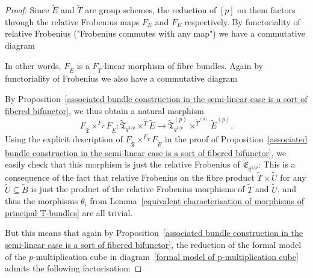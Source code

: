 \documentclass[11pt,oneside]{amsart}
\theoremstyle{definition}
\theoremstyle{remark}
\begin{document}
\begin{proof}
	Since $\tilde{E}$ and $\tilde{T}$ are group schemes, the reduction of $[p]$ on them factors through the relative Frobenius maps $F_E$ and $F_E$ respectively. By functoriality of relative Frobenius ("Frobenius commutes with any map") we have a commutative diagram
	\begin{center}
	\end{center}
	In other words, $F_{\tilde E}$ is a $F_{\tilde T}$-linear morphism of fibre bundles. Again by functoriality of Frobenius we also have a commutative diagram
	\begin{center}
	\end{center}
	
	By Proposition~\ref{associated bundle construction in the semi-linear case is a sort of fibered bifunctor}, we thus obtain a natural morphism
	\[F_{\tilde{\mathfrak{T}}}\times^{F_{\tilde{T}}} F_{\tilde
		E}:\tilde{\mathfrak T}_{q^{1/p}}\times^{\tilde T}\tilde E \rightarrow \tilde{\mathfrak T}_{q^{1/p}}^{(p)}\times^{\tilde T^{(p)}}\tilde E^{(p)}. \]
	Using the explicit description of $F_{\tilde{\mathfrak{T}}}\times^{F_{\tilde{T}}} F_{\tilde
		E}$ in the proof of Proposition~\ref{associated bundle construction in the semi-linear case is a sort of fibered bifunctor}, we easily check that this morphism is just the relative Frobenius of $\tilde{\mathfrak{E}}_{q^{1/p}}$: This is a consequence of the fact that relative Frobenius on the fibre product $\tilde{T}\times \tilde{U}$ for any $\tilde{U}\subseteq \tilde{B}$ is just the product of the relative Frobenius morphisms of $\tilde T$ and $\tilde U$, and thus the morphisms $\theta_i$ from Lemma~\ref{equivalent characterisation of morphisms of principal T-bundles} are all trivial. 
	
	But this means that again by Proposition~\ref{associated bundle construction in the semi-linear case is a sort of fibered bifunctor}, the reduction of the formal model of the $p$-multiplication cube in diagram~\ref{formal model of p-multiplication cube} admits the following factorisation:
	

\end{proof}
\end{document}
